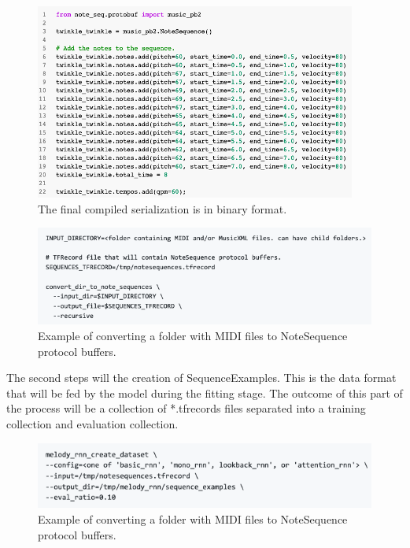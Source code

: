 \begin{figure}[h!]
  \caption{The final compiled serialization is in binary format.}
  \includegraphics[width=\linewidth]{image/fig_JDF32.png}
\end{figure}

\begin{figure}[h!]
  \centering
  \includegraphics[width=\linewidth]{image/fig_JDF03.png}
  \caption{Example of converting a folder with MIDI files to NoteSequence protocol buffers.}
\end{figure}


The second steps will the creation of SequenceExamples. This is the data format that will
be fed by the model during the fitting stage. The outcome of this part of the process will
be a collection of *.tfrecords files separated into a training collection and evaluation
collection.

\begin{figure}[h!]
  \centering
  \includegraphics[width=\linewidth]{image/fig_JDF04.png}
  \caption{Example of converting a folder with MIDI files to NoteSequence protocol buffers.}
\end{figure}



